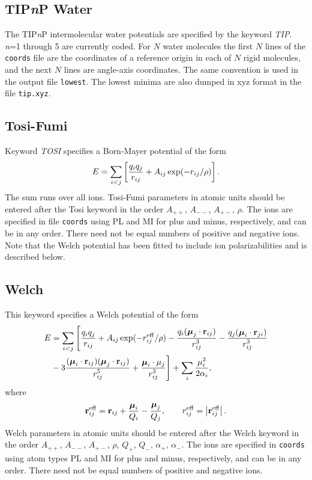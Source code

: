 \documentclass[12pt,a4paper,dvips]{article}
\newcommand{\D}{\displaystyle}
\begin{document}
\subsection{TIP{\it n\/}P Water}

The TIP{\it n\/}P intermolecular water potentials are specified by the keyword {\it TIP\/}.
{\it n\/}=1 through 5 are currently coded. For $N$ water molecules the first $N$ lines of
the {\tt coords} file are the coordinates of a reference origin in each of $N$ rigid molecules,
and the next $N$ lines are angle-axis coordinates. The same convention is used in the output
file {\tt lowest}. The lowest minima are also dumped in xyz format in the file {\tt tip.xyz}.

\subsection{Tosi-Fumi}
 
Keyword {\it TOSI\/} specifies a Born-Mayer potential of the form
$$ E = \sum_{i<j}\left[ {q_i q_j\over r_{ij}} + A_{ij}\exp(-r_{ij}/\rho) \right]. $$
The sum runs over all ions. Tosi-Fumi\cite{tosif64} parameters in atomic units should be
entered after the Tosi keyword in the order $A_{++}$, $A_{--}$, $A_{+-}$, $\rho$.
The ions are specified in file {\tt coords} using PL and MI for plus and minus, respectively,
and can be in any order. There need not be equal numbers of positive and negative ions.
Note that the Welch potential has been fitted to include ion polarizabilities and is described below.

\subsection{Welch}This keyword specifies a Welch potential\cite{welchld76,phillipscb91} of the form
\begin{eqnarray*}
E &= \sum_{i<j}\Bigg[ {\D q_i q_j\over\D  r_{ij}} + A_{ij}\exp(-r_{ij}^{\rm eff}/\rho)
              -{\D q_i({\boldsymbol \mu}_j\cdot{\bf r}_{ij})\over\D  r_{ij}^3}
              -{\D q_j({\boldsymbol \mu}_i\cdot{\bf r}_{ji})\over\D  r_{ij}^3} \\
             &-3{\D   ({\boldsymbol \mu}_i\cdot{\bf r}_{ij})
                   ({\boldsymbol \mu}_j\cdot{\bf r}_{ij})\over\D  r_{ij}^5}
              +{\D  {\boldsymbol \mu}_i\cdot{{\bf{\mu}}}_j\over\D  r_{ij}^3}\Bigg]
              +\sum_i {\D \mu_i^2\over\D 2\alpha_i}, \\
\end{eqnarray*}
where
$$ {\bf r}_{ij}^{\rm eff}={\bf r}_{ij}+{{\boldsymbol \mu}_i\over Q_i}-{{\boldsymbol \mu}_j\over Q_j},
    \qquad r_{ij}^{\rm eff}=\left|{\bf r}_{ij}^{\rm eff}\right|. $$
Welch parameters in atomic units should be
entered after the Welch keyword in the order $A_{++}$, $A_{--}$, $A_{+-}$, $\rho$, $Q_+$,
$Q_-$, $\alpha_+$, $\alpha_-$.
The ions are specified in {\tt coords}  using atom types PL and MI for plus and minus, respectively,
and can be in any order. There need not be equal numbers of positive and negative ions.
\end{document}
